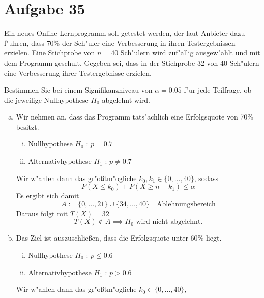 \section{Aufgabe 35}
\setcounter{section}{35}

Ein neues Online-Lernprogramm soll getestet werden, der laut Anbieter dazu
f"uhren, dass 70\% der Sch"uler eine Verbesserung in ihren Testergebnissen
erzielen. Eine Stichprobe von $n = 40$ Sch"ulern wird zuf"allig ausgew"ahlt und
mit dem Programm geschult. Gegeben sei, dass in der Stichprobe 32 von 40
Sch"ulern eine Verbesserung ihrer Testergebnisse erzielen.

Bestimmen Sie bei einem Signifikanzniveau von $\alpha = 0.05$ f"ur jede
Teilfrage, ob die jeweilige Nullhypothese $H_0$ abgelehnt wird.

\begin{enumerate}[(a)]
    \item Wir nehmen an, dass das Programm tats"achlich eine Erfolgsquote von
        70\% besitzt.
        \begin{enumerate}[i)]
            \item Nullhypothese $H_0$ : $p = 0.7$
            \item Alternativhypothese $H_1$ : $p \neq 0.7$
        \end{enumerate}
        Wir w"ahlen dann das gr"o{\ss}tm"ogliche $k_0, k_1 \in \{0,...,40\}$,
        sodass
        \begin{equation*}
            P(X \leq k_0) + P(X \geq n - k_1) \leq \alpha
        \end{equation*}
        Es ergibt sich damit
        \begin{equation*}
            A := \{0,...,21\} \cup \{34,...,40\} \quad \text{Ablehnungsbereich}
        \end{equation*}
        Daraus folgt mit $T(X) = 32$
        \begin{equation*}
            T(X) \notin A \implies H_0 \text{ wird nicht abgelehnt.}
        \end{equation*}
    \item Das Ziel ist auszuschlie{\ss}en, dass die Erfolgsquote unter 60\% liegt.
        \begin{enumerate}[i)]
            \item Nullhypothese $H_0$ : $p \leq 0.6$
            \item Alternativhypothese $H_1$ : $p > 0.6$
        \end{enumerate}
        Wir w"ahlen dann das gr"o{\ss}tm"ogliche $k_0 \in \{0,...,40\}$,

\end{enumerate}
